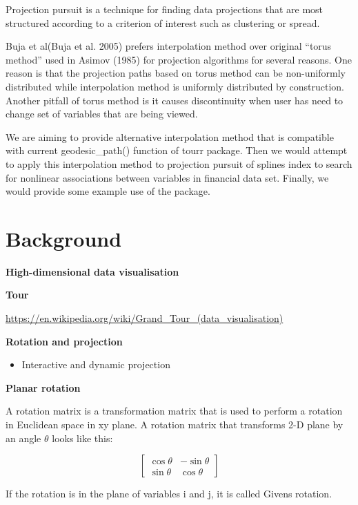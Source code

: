 Projection pursuit is a technique for finding data projections that are most structured according to a criterion of interest such as clustering or spread.

Buja et al(Buja et al. 2005) prefers interpolation method over original ``torus method'' used in Asimov (1985) for projection algorithms for several reasons. One reason is that the projection paths based on torus method can be non-uniformly distributed while interpolation method is uniformly distributed by construction. Another pitfall of torus method is it causes discontinuity when user has need to change set of variables that are being viewed.

We are aiming to provide alternative interpolation method that is compatible with current geodesic\_path() function of tourr package. Then we would attempt to apply this interpolation method to projection pursuit of splines index to search for nonlinear associations between variables in financial data set. Finally, we would provide some example use of the package.

\hypertarget{background}{%
\section{Background}\label{background}}

\textbf{High-dimensional data visualisation}

\textbf{Tour}

\url{https://en.wikipedia.org/wiki/Grand_Tour_(data_visualisation)}

\textbf{Rotation and projection}

\begin{itemize}
\tightlist
\item
  Interactive and dynamic projection
\end{itemize}

\textbf{Planar rotation}

A rotation matrix is a transformation matrix that is used to perform a rotation in Euclidean space in xy plane. A rotation matrix that transforms 2-D plane by an angle \(\theta\) looks like this:

\[ \begin{bmatrix}\cos \theta &-\sin \theta \\\sin \theta &\cos \theta \end{bmatrix} \]

If the rotation is in the plane of variables i and j, it is called Givens rotation.

